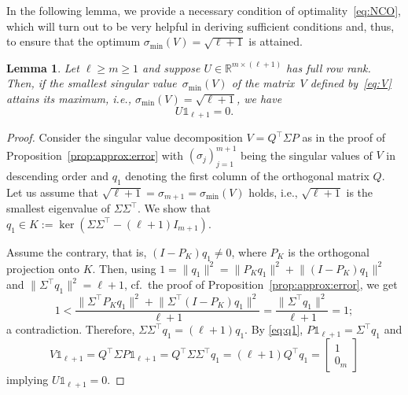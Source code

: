 \documentclass[a4paper, reqno]{amsart}
\newcommand{\R}{\ensuremath{\mathbb R}}
\newcommand{\dd}{\ell}
\newcommand{\one}{\mathds{1}}
\newtheorem{lemma}[theorem]{Lemma}
\begin{document}
In the following lem\-ma, we provide a necessary condition of optimality~\eqref{eq:NCO}, which will turn out to be very helpful in deriving sufficient conditions and, thus, to ensure that the optimum $\sigma_\mathrm{min}(V) = \sqrt{\dd+1}$ is attained.
\begin{lemma}%
\label{lem:NCO}
    Let $\dd \geq m \geq 1$ and suppose $U\in \R^{m\times (\dd+1)}$ has full row rank. 
    Then, if the smallest singular value~$\sigma_\mathrm{min}(V)$ of the matrix~$V$ defined by~\eqref{eq:V} attains its maximum, i.e., $\sigma_\mathrm{min}(V) = \sqrt{\dd+1}$, we have
    \begin{equation}\label{eq:NCO}\tag{NCO}
        U \one_{\dd+1} = 0.
    \end{equation}
\end{lemma}
\begin{proof}
    Consider the singular value decomposition $V = Q^\top\Sigma P$ as in the proof of Proposition~\ref{prop:approx:error} with $(\sigma_j)_{j=1}^{m+1}$ being the singular values of $V$ in descending order and $q_1$ denoting the first column of the orthogonal matrix $Q$. Let us assume that $\sqrt{\dd+1}=\sigma_{m+1}=\sigma_\mathrm{min}(V)$ holds, i.e., $\sqrt{\dd+1}$ is the smallest eigenvalue of $\Sigma\Sigma^\top$. We show that $q_1\in K:=\operatorname{ker}\!\left(\Sigma\Sigma^\top-(\dd+1) I_{m+1}\right)$. 
    
    Assume the contrary, that is, $(I-P_K)q_1\neq 0$, where $P_K$ is the orthogonal projection onto $K$. Then, using $1=\lVert q_1\rVert^2 = \lVert P_K q_1 \rVert^2 + \lVert (I-P_K)q_1\rVert^2$ and $\lVert \Sigma^\top q_1\rVert^2 = \dd+1$, cf.\ the proof of Proposition~\ref{prop:approx:error}, we get
    \begin{equation*}
        1 <  \frac{\lVert \Sigma^\top P_K q_1\rVert^2 + \lVert \Sigma^\top (I-P_K)q_1\rVert^2}{\dd+1} = \frac{\lVert \Sigma^\top q_1\rVert^2}{\dd+1} = 1;
    \end{equation*}
    a contradiction. Therefore, $\Sigma\Sigma^\top q_1 = (\dd+1) q_1$. By \eqref{eq:q1}, $P\one_{\dd+1} = \Sigma^\top q_1$ and
    \begin{equation}\nonumber
        V\one_{\dd+1} = Q^\top \Sigma P\one_{\dd+1} = Q^\top \Sigma\Sigma^\top q_1 = (\dd+1) Q^\top q_1 = \begin{bmatrix}
            1\\ 0_m
        \end{bmatrix}
    \end{equation}
    implying $U\one_{\dd+1}=0$.
\end{proof}
\end{document}
